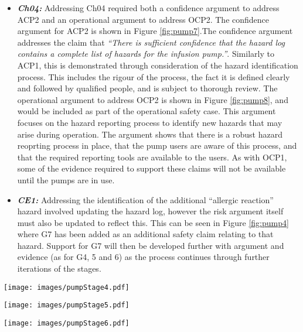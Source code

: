\begin{itemize}
    \item \textbf{\textit{Ch04:}} Addressing Ch04 required both a confidence argument to address ACP2 and an operational argument to address OCP2. The confidence argument for ACP2 is shown in Figure \ref{fig:pump7}.The confidence argument addresses the claim that \textit{``There is sufficient confidence that the hazard log contains a complete list of hazards for the infusion pump.''}. Similarly to ACP1, this is demonstrated through consideration of the hazard identification process. This includes the rigour of the process, the fact it is defined clearly and followed by qualified people, and is subject to thorough review.
    The operational argument to address OCP2 is shown in Figure \ref{fig:pump8}, and would be included as part of the operational safety case. This argument focuses on the hazard reporting process to identify new hazards that may arise during operation. The argument shows that there is a robust hazard reoprting process in place, that the pump users are aware of this process, and that the required reporting tools are available to the users. As with OCP1, some of the evidence required to support these claims will not be available until the pumps are in use.    
    \item \textbf{\textit{CE1:}} Addressing the identification of the additional ``allergic reaction'' hazard involved updating the hazard log, however the risk argument itself must also be updated to reflect this. This can be seen in Figure \ref{fig:pump4} where G7 has been added as an additional safety claim relating to that hazard. Support for G7 will then be developed further with argument and evidence (as for G4, 5 and 6) as the process continues through further iterations of the stages.
\end{itemize}


\begin{figure*}
\texttt{[image: images/pumpStage4.pdf]}
\caption{Changing the infusion pump risk argument to address potential challenges.}
\label{fig:pump4}
\end{figure*}


\begin{figure*}
\centering
\texttt{[image: images/pumpStage5.pdf]}
\caption{Confidence argument for ACP1.}
\label{fig:pump5}
\end{figure*}

\begin{figure*}
\centering
\texttt{[image: images/pumpStage6.pdf]}
\caption{Operational safety argument for OCP1 (part of the operational safety case for the infusion pump).}
\label{fig:pump6}
\end{figure*}

